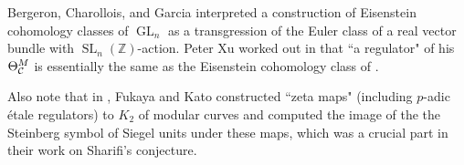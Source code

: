 \documentclass[12pt,amstex,amssymb]{article}
\theoremstyle{plain}
\theoremstyle{definition}
\def\cC{{\cal C}}
\def\Z{{\mathbb Z}}
\def\Q{{\mathbb Q}}
\newcommand{\GL}{\operatorname{GL}}
\newcommand{\SL}{\operatorname{SL}}
\begin{document}


 Bergeron, Charollois, and Garcia \cite{BCG} interpreted a construction of Eisenstein cohomology classes of $\GL_n$ as a transgression of the Euler class of a real vector bundle with $\SL_n(\Z)$-action. Peter Xu worked out in \cite{Xu} that ``a regulator" of his $\Theta_{\cC}^M$ is essentially the same as the Eisenstein cohomology class of \cite{BCG}.
 



Also note that  in \cite{FK}, Fukaya and Kato constructed ``zeta maps" (including $p$-adic \'etale regulators) to $K_2$ of modular curves and computed the image of the the Steinberg symbol of Siegel units under these maps,
which was a crucial part in their work on Sharifi's conjecture.



\end{document}
